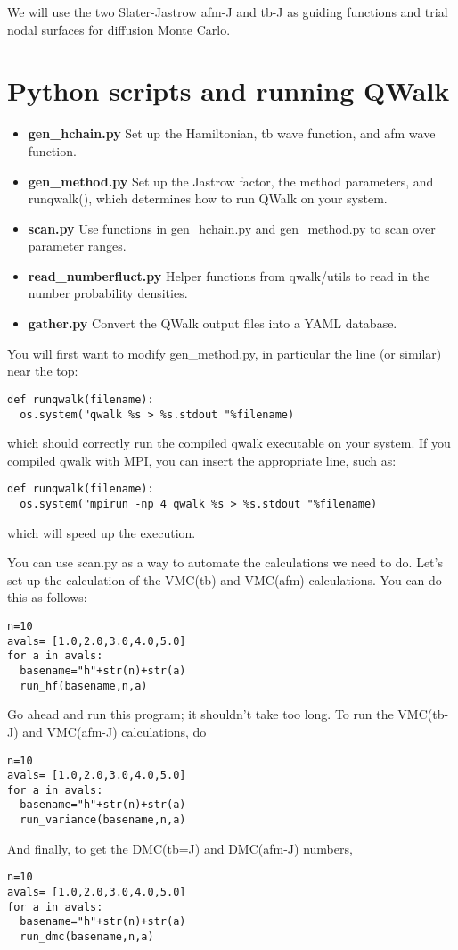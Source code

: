 \documentclass[12pt]{article}
\begin{document}
We will use the two Slater-Jastrow afm-J and tb-J as guiding functions and trial nodal surfaces for diffusion Monte Carlo.



\section*{Python scripts and running QWalk}

\begin{itemize}
\item {\bf gen\_hchain.py} Set up the Hamiltonian, tb wave function, and afm wave function.
\item {\bf gen\_method.py} Set up the Jastrow factor, the method parameters, and runqwalk(), which determines how to run QWalk on your system.
\item {\bf scan.py} Use functions in gen\_hchain.py and gen\_method.py to scan over parameter ranges.
\item {\bf read\_numberfluct.py} Helper functions from qwalk/utils to read in the number probability densities.
\item {\bf gather.py} Convert the QWalk output files into a YAML database.
\end{itemize}

You will first want to modify gen\_method.py, in particular the line (or similar) near the top:
\begin{verbatim}
def runqwalk(filename):
  os.system("qwalk %s > %s.stdout "%filename)
\end{verbatim}
which should correctly run the compiled qwalk executable on your system. 
If you compiled qwalk with MPI, you can insert the appropriate line, such as:
\begin{verbatim}
def runqwalk(filename):
  os.system("mpirun -np 4 qwalk %s > %s.stdout "%filename)
\end{verbatim}
which will speed up the execution.


You can use scan.py as a way to automate the calculations we need to do.
Let's set up the calculation of the VMC(tb) and VMC(afm) calculations. 
You can do this as follows:
\begin{verbatim}
n=10
avals= [1.0,2.0,3.0,4.0,5.0]
for a in avals:
  basename="h"+str(n)+str(a)
  run_hf(basename,n,a)
\end{verbatim}
Go ahead and run this program; it shouldn't take too long.
To run the VMC(tb-J) and VMC(afm-J) calculations, do
\begin{verbatim}
n=10
avals= [1.0,2.0,3.0,4.0,5.0]
for a in avals:
  basename="h"+str(n)+str(a)
  run_variance(basename,n,a)
\end{verbatim}
And finally, to get the DMC(tb=J) and DMC(afm-J) numbers,
\begin{verbatim}
n=10
avals= [1.0,2.0,3.0,4.0,5.0]
for a in avals:
  basename="h"+str(n)+str(a)
  run_dmc(basename,n,a)
\end{verbatim}
\end{document}
